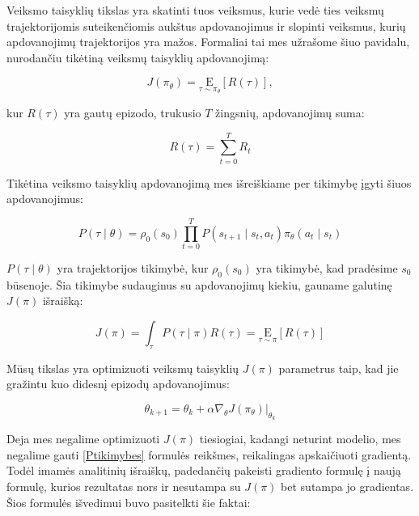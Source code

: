 \documentclass[a4paper, 12pt]{article}
\begin{document}
Veiksmo taisyklių tikslas yra skatinti tuos veiksmus, kurie vedė ties veiksmų trajektorijomis suteikenčiomis aukštus apdovanojimus ir slopinti veiksmus, kurių apdovanojimų trajektorijos yra mažos. Formaliai tai mes užrašome šiuo pavidalu, nurodančiu tikėtiną veiksmų taisyklių apdovanojimą:

\begin{equation}
J\left(\pi_{\theta}\right)=\underset{\tau \sim \pi_{\theta}}{\mathrm{E}}[R(\tau)],
\end{equation}

kur $R(\tau)$ yra gautų epizodo, trukusio $T$ žingsnių, apdovanojimų suma:

\begin{equation}
R(\tau) = \sum_{t=0}^{T} R_{t}
\end{equation}

Tikėtina veiksmo taisyklių apdovanojimą mes išreiškiame per tikimybę įgyti šiuos apdovanojimus:

\begin{equation}
\label{Ptikimybes}
P(\tau \mid \theta)=\rho_{0}\left(s_{0}\right) \prod_{t=0}^{T} P\left(s_{t+1} \mid s_{t}, a_{t}\right) \pi_{\theta}\left(a_{t} \mid s_{t}\right)
\end{equation}

$P(\tau \mid \theta)$ yra trajektorijos tikimybė, kur $\rho_{0}\left(s_{0}\right)$ yra tikimybė, kad pradėsime $s_0$ būsenoje. Šia tikimybe sudauginus su apdovanojimų kiekiu, gauname galutinę $J(\pi)$ išraišką:

\begin{equation}
J(\pi)=\int_{\tau} P(\tau \mid \pi) R(\tau)=\underset{\tau \sim \pi}{\mathrm{E}}[R(\tau)]
\end{equation}

Mūsų tikslas yra optimizuoti veiksmų taisyklių $J(\pi)$ parametrus taip, kad jie gražintu kuo didesnį epizodų apdovanojimus:

\begin{equation}
\theta_{k+1}=\theta_{k}+\left.\alpha \nabla_{\theta} J\left(\pi_{\theta}\right)\right|_{\theta_{k}}
\end{equation}

Deja mes negalime optimizuoti $J(\pi)$ tiesiogiai, kadangi neturint modelio, mes negalime gauti \ref{Ptikimybes} formulės reikšmes, reikalingas apskaičiuoti gradientą. Todėl imamės analitinių išraiškų, padedančių pakeisti gradiento formulę į naują formulę, kurios rezultatas nors ir nesutampa su $J(\pi)$ bet sutampa jo gradientas. Šios formulės išvedimui buvo pasitelkti šie faktai:
\end{document}

